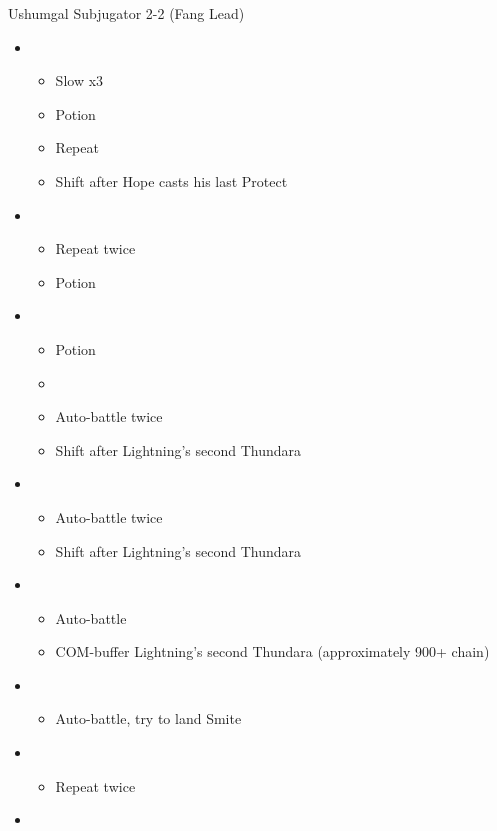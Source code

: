 \begin{battle}{Ushumgal Subjugator 2-2 (Fang Lead)}
\begin{itemize}
    \item \fifth
    \begin{itemize}
        \item Slow x3
        \item Potion
        \item Repeat
        \item Shift after Hope casts his last Protect
    \end{itemize}
    \item \third
    \begin{itemize}
        \item Repeat twice
        \item Potion
    \end{itemize}
    \item \second
    \begin{itemize}
        \item Potion
        \item \stagger
        \item Auto-battle twice
        \item Shift after Lightning's second Thundara
    \end{itemize}
    \item \sixth
    \begin{itemize}
        \item Auto-battle twice
        \item Shift after Lightning's second Thundara
    \end{itemize}
    \item \second
    \begin{itemize}
        \item Auto-battle
        \item COM-buffer Lightning's second Thundara (approximately 900+ chain)
    \end{itemize}
    \item \first
    \begin{itemize}
        \item Auto-battle, try to land Smite
    \end{itemize}
    \item \third
    \begin{itemize}
        \item Repeat twice
    \end{itemize}
    \item \fourth

\end{itemize}
\end{battle}
